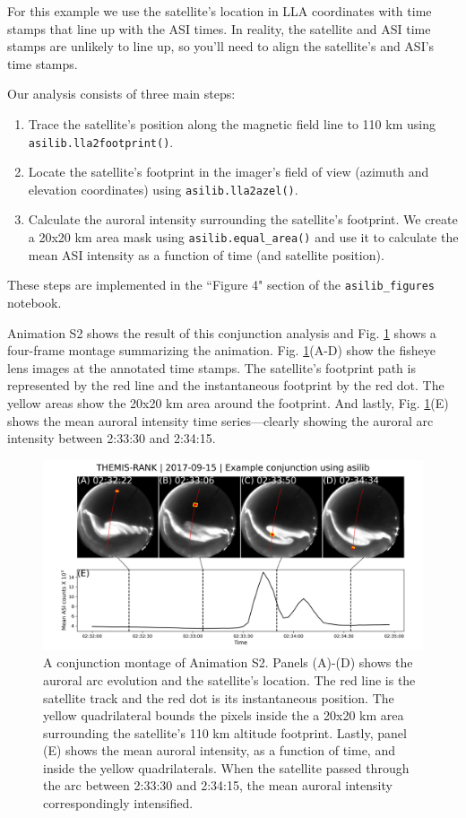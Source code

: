 \documentclass[utf8]{FrontiersinHarvard} %
\begin{document}
For this example we use the satellite's location in LLA coordinates with time stamps that line up with the ASI times. In reality, the satellite and ASI time stamps are unlikely to line up, so you'll need to align the satellite's and ASI's time stamps.

Our analysis consists of three main steps:
\begin{enumerate}
    \item Trace the satellite's position along the magnetic field line to 110 km using  \verb|asilib.lla2footprint()|.
    \item Locate the satellite's footprint in the imager's field of view (azimuth and elevation coordinates) using \verb|asilib.lla2azel()|.
    \item Calculate the auroral intensity surrounding the satellite's footprint. We create a 20x20 km area mask using \verb|asilib.equal_area()| and use it to calculate the mean ASI intensity as a function of time (and satellite position).
\end{enumerate} These steps are implemented in the ``Figure 4" section of the \verb|asilib_figures| notebook.

Animation S2 shows the result of this conjunction analysis and Fig. \ref{fig4} shows a four-frame montage summarizing the animation. Fig. \ref{fig4}(A-D) show the fisheye lens images at the annotated time stamps. The satellite's footprint path is represented by the red line and the instantaneous footprint by the red dot. The yellow areas show the 20x20 km area around the footprint. And lastly, Fig. \ref{fig4}(E) shows the mean auroral intensity time series---clearly showing the auroral arc intensity between 2:33:30 and 2:34:15.

\begin{figure}
      \includegraphics[width=\textwidth]{figures/fig4.jpg}
      \caption{A conjunction montage of Animation S2. Panels (A)-(D) shows the auroral arc evolution and the satellite's location. The red line is the satellite track and the red dot is its instantaneous position. The yellow quadrilateral bounds the pixels inside the a 20x20 km area surrounding the satellite's 110 km altitude footprint. Lastly, panel (E) shows the mean auroral intensity, as a function of time, and inside the yellow quadrilaterals. When the satellite passed through the arc between 2:33:30 and 2:34:15, the mean auroral intensity correspondingly intensified.}
      \label{fig4}
\end{figure}
\end{document}
